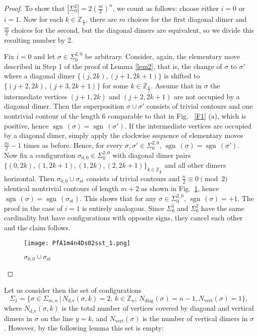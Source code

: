 \documentclass[12pt,reqno]{amsart}
\numberwithin{equation}{section}
\newcommand{\Z}{{\mathbb Z}}
\newcommand{\sg}{\sigma}
\newcommand{\sgn}{{\operatorname{sgn}\,}}
\begin{document}
\begin{proof}
\par To show that $|\Sigma_0^2|=2\left(\frac{m}{2}\right)^n$, we count as follows: choose either $i=0$ or $i=1$. Now for each $k\in\mathbb Z_{\frac{n}{2}}$, there are $m$ choices for the first diagonal dimer and $\frac{m}{2}$ choices for the second, but the diagonal dimers are equivalent, so we divide this resulting number by 2.
\par Fix $i=0$ and let $\sigma\in\Sigma_0^{2,0}$ be arbitrary. Consider, again, the elementary move described in Step 1 of the proof of Lemma \ref{lem2}, that is, the change of $\sigma$ to $\sigma'$ where a diagonal dimer $\{(j,2k),(j+1,2k+1)\}$ is shifted to $\{(j+2,2k),(j+3,2k+1)\}$ for some $k\in\mathbb Z_{\frac{n}{2}}$. Assume that in $\sigma$ the intermediate vertices $(j+1,2k)$ and $(j+2,2k+1)$ are not occupied by a diagonal dimer. Then the superposition $\sigma\cup\sigma'$ consists of trivial contours and one nontrivial contour of the length 6 comparable to that in Fig. \ \ref{F1} (a), which is positive, hence $\sgn(\sigma)=\sgn(\sigma')$. If the intermediate vertices are occupied by a diagonal dimer, simply apply the clockwise sequence of elementary moves $\frac{m}{2}-1$ times as before. Hence, for every $\sg,\sg'\in\Sigma_0^{2,0}$, $\sgn(\sigma)=\sgn(\sigma')$. Now fix a configuration $\sg_{0,0}\in\Sigma_0^{2,0}$ with diagonal dimer pairs $\{(0,2k),(1,2k+1),(1,2k),(2,2k+1)\}_{k\in\mathbb{Z}_{\frac{n}{2}}}$ and all other dimers horizontal. Then $\sigma_{0,0}\cup\sigma_{\textrm{st}}$ consists of trivial contours and $\frac{n}{2}\equiv 0\pmod 2$ identical nontrivial contours of length $m+2$ as shown in Fig.\ \ref{F2}, hence $\sgn(\sigma)=\sgn(\sigma_{\textrm{st}})$. This shows that for any $\sigma\in\Sigma_0^{2,0}$, $\sgn(\sigma)=+1$. The proof in the case of $i=1$ is entirely analogous. Since $\Sigma_0^1$ and $\Sigma_0^2$ have the same cardinality but have configurations with opposite signs, they cancel each other and the claim follows.
\begin{figure}
\texttt{[image: PfA1m4n4Ds02sst\_1.png]}
\caption{$\sg_{0,0}\cup\sg_{\textrm{st}}$}
\label{F2}
\end{figure}
\end{proof}
Let us consider then the set of configurations 
\[\Sigma_1=\{\sg\in\Sigma_{m,n}\,|\, N_{\textrm{d,v}}(\sg,k)=2, \, k\in\Z_n;\,N_{\textrm{diag}}(\sg)=n-1, N_{\textrm{vert}}(\sg)=1\},\]
where $N_{\textrm{d,v}}(\sg,k)$ is the total number of vertices covered by diagonal and vertical dimers in $\sg$ on the line $y=k$, and $N_{\textrm{vert}}(\sg)$ is the number of vertical dimers in $\sg$. However, by the following lemma this set is empty:
\end{document}
